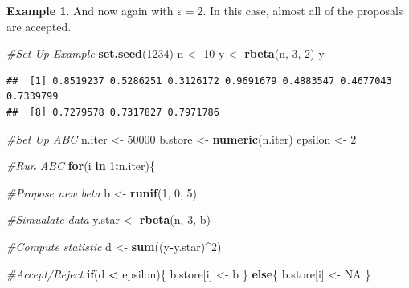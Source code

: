 \documentclass[
]{book}
\newenvironment{Shaded}{\begin{snugshade}}{\end{snugshade}}
\newcommand{\CommentTok}[1]{\textcolor[rgb]{0.56,0.35,0.01}{\textit{#1}}}
\newcommand{\ConstantTok}[1]{\textcolor[rgb]{0.56,0.35,0.01}{#1}}
\newcommand{\ControlFlowTok}[1]{\textcolor[rgb]{0.13,0.29,0.53}{\textbf{#1}}}
\newcommand{\DecValTok}[1]{\textcolor[rgb]{0.00,0.00,0.81}{#1}}
\newcommand{\FunctionTok}[1]{\textcolor[rgb]{0.13,0.29,0.53}{\textbf{#1}}}
\newcommand{\NormalTok}[1]{#1}
\newcommand{\OtherTok}[1]{\textcolor[rgb]{0.56,0.35,0.01}{#1}}
\newcommand{\SpecialCharTok}[1]{\textcolor[rgb]{0.81,0.36,0.00}{\textbf{#1}}}
\theoremstyle{definition}
\theoremstyle{definition}
\newtheorem{example}{Example}[chapter]
\theoremstyle{definition}
\theoremstyle{definition}
\theoremstyle{remark}
\begin{document}
\begin{example}
And now again with \(\varepsilon = 2\). In this case, almost all of the proposals are accepted.

\begin{Shaded}
\begin{Highlighting}[]
\CommentTok{\#Set Up Example}
\FunctionTok{set.seed}\NormalTok{(}\DecValTok{1234}\NormalTok{)}
\NormalTok{n }\OtherTok{\textless{}{-}} \DecValTok{10}
\NormalTok{y }\OtherTok{\textless{}{-}} \FunctionTok{rbeta}\NormalTok{(n, }\DecValTok{3}\NormalTok{, }\DecValTok{2}\NormalTok{)}
\NormalTok{y}
\end{Highlighting}
\end{Shaded}

\begin{verbatim}
##  [1] 0.8519237 0.5286251 0.3126172 0.9691679 0.4883547 0.4677043 0.7339799
##  [8] 0.7279578 0.7317827 0.7971786
\end{verbatim}

\begin{Shaded}
\begin{Highlighting}[]
\CommentTok{\#Set Up ABC}
\NormalTok{n.iter }\OtherTok{\textless{}{-}} \DecValTok{50000}
\NormalTok{b.store }\OtherTok{\textless{}{-}} \FunctionTok{numeric}\NormalTok{(n.iter)}
\NormalTok{epsilon }\OtherTok{\textless{}{-}} \DecValTok{2}

\CommentTok{\#Run ABC}
\ControlFlowTok{for}\NormalTok{(i }\ControlFlowTok{in} \DecValTok{1}\SpecialCharTok{:}\NormalTok{n.iter)\{}
  
  \CommentTok{\#Propose new beta}
\NormalTok{  b }\OtherTok{\textless{}{-}} \FunctionTok{runif}\NormalTok{(}\DecValTok{1}\NormalTok{, }\DecValTok{0}\NormalTok{, }\DecValTok{5}\NormalTok{)}
  
  \CommentTok{\#Simualate data}
\NormalTok{  y.star }\OtherTok{\textless{}{-}} \FunctionTok{rbeta}\NormalTok{(n, }\DecValTok{3}\NormalTok{, b)}
  
  \CommentTok{\#Compute statistic}
\NormalTok{  d }\OtherTok{\textless{}{-}} \FunctionTok{sum}\NormalTok{((y}\SpecialCharTok{{-}}\NormalTok{y.star)}\SpecialCharTok{\^{}}\DecValTok{2}\NormalTok{)}
  
  \CommentTok{\#Accept/Reject}
  \ControlFlowTok{if}\NormalTok{(d }\SpecialCharTok{\textless{}}\NormalTok{ epsilon)\{}
\NormalTok{    b.store[i] }\OtherTok{\textless{}{-}}\NormalTok{ b}
\NormalTok{  \} }\ControlFlowTok{else}\NormalTok{\{}
\NormalTok{    b.store[i] }\OtherTok{\textless{}{-}} \ConstantTok{NA}
\NormalTok{  \}}
  

\end{Highlighting}
\end{Shaded}
\end{example}
\end{document}
